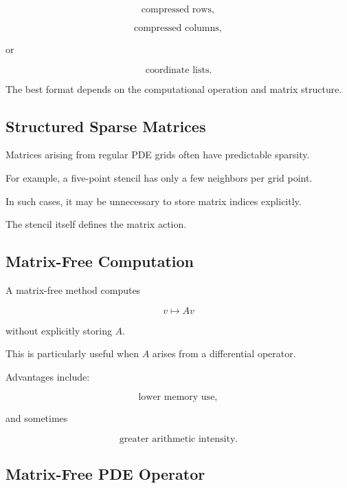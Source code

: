 \[
\boxed{
\text{compressed rows},
}
\]

\[
\boxed{
\text{compressed columns},
}
\]

or

\[
\boxed{
\text{coordinate lists}.
}
\]

The best format depends on the computational operation and matrix
structure.

\subsection{Structured Sparse Matrices}
\label{subsec:structured-sparse-matrices}

Matrices arising from regular PDE grids often have predictable sparsity.

For example, a five-point stencil has only a few neighbors per grid point.

In such cases, it may be unnecessary to store matrix indices explicitly.

The stencil itself defines the matrix action.

\subsection{Matrix-Free Computation}
\label{subsec:hpmc-matrix-free}

A matrix-free method computes

\[
\boxed{
v
\mapsto
Av
}
\]

without explicitly storing \(A\).

This is particularly useful when \(A\) arises from a differential
operator.

Advantages include:

\[
\boxed{
\text{lower memory use},
}
\]

and sometimes

\[
\boxed{
\text{greater arithmetic intensity}.
}
\]

\subsection{Matrix-Free PDE Operator}
\label{subsec:matrix-free-pde-operator}

